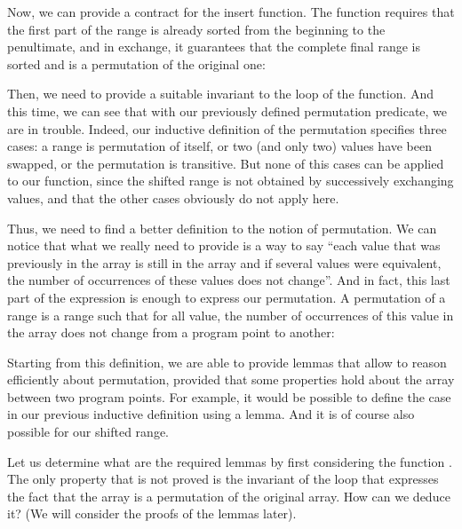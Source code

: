 


Now, we can provide a contract for the insert function. The function requires
that the first part of the range is already sorted from the beginning to the
penultimate, and in exchange, it guarantees that the complete final range is
sorted and is a permutation of the original one:






Then, we need to provide a suitable invariant to the loop of the
 function. And this time, we can see that with our
previously defined permutation predicate, we are in trouble.
Indeed, our inductive definition of the permutation specifies three cases: a
range is permutation of itself, or two (and only two) values have been swapped,
or the permutation is transitive. But none of this cases can be applied to our 
 function, since the shifted range is not obtained by
successively exchanging values, and that the other cases obviously do not apply
here.



Thus, we need to find a better definition to the notion of permutation. We can
notice that what we really need to provide is a way to say ``each value that
was previously in the array is still in the array and if several values were
equivalent, the number of occurrences of these values does not change''. And in
fact, this last part of the expression is enough to express our permutation.
A permutation of a range is a range such that for all value, the number of
occurrences of this value in the array does not change from a program point to
another:






Starting from this definition, we are able to provide lemmas that allow to
reason efficiently about permutation, provided that some properties hold about
the array between two program points. For example, it would be possible to define
the case  in our previous inductive definition using a lemma.
And it is of course also possible for our shifted range.




Let us determine what are the required lemmas by first considering the function
. The only property that is not proved is the invariant
of the loop that expresses the fact that the array is a permutation of the
original array. How can we deduce it? (We will consider the proofs of the lemmas
later).




